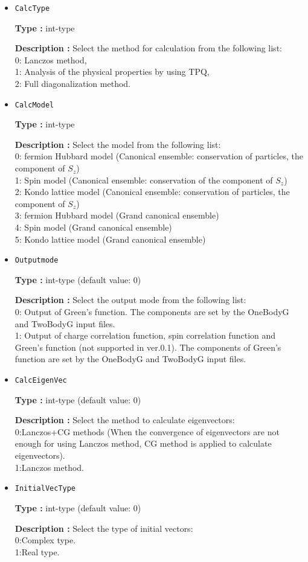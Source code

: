 \begin{itemize}
\item  \verb|CalcType|

{\bf Type :} int-type 

{\bf Description :} Select the method for calculation from the following list:\\
0: Lanczos method,\\
1: Analysis of the physical properties by using TPQ,\\
2: Full diagonalization method.\\

\item  \verb|CalcModel|

{\bf Type :} int-type 

{\bf Description :} Select the model from the following list:\\
0: fermion Hubbard model (Canonical ensemble: conservation of particles, the component of $S_z$)\\
1: Spin model (Canonical ensemble: conservation of the component of $S_z$)\\
2: Kondo lattice model (Canonical ensemble: conservation of particles, the component of $S_z$)\\
3: fermion Hubbard model (Grand canonical ensemble)\\
4: Spin model (Grand canonical ensemble)\\
5: Kondo lattice model (Grand canonical ensemble)

\item  \verb|Outputmode|

{\bf Type :} int-type (default value: 0)

{\bf Description :} Select the output mode from the following list:\\
0: Output of Green's function. The components are set by the OneBodyG and TwoBodyG input files.\\
1: Output of charge correlation function, spin correlation function and Green's function (not supported in ver.0.1). The components of Green's function are set by the OneBodyG and TwoBodyG input files.\\

\item  \verb|CalcEigenVec|

{\bf Type :} int-type (default value: 0)

{\bf Description :} Select the method to calculate eigenvectors:\\
0:Lanczos+CG methods (When the convergence of eigenvectors are not enough for using Lanczos method,  CG method is applied to calculate eigenvectors).\\
1:Lanczos method.\\

\item  \verb|InitialVecType|

{\bf Type :} int-type (default value: 0)

{\bf Description :} Select the type of initial vectors:\\
0:Complex type.\\
1:Real type.\\

\end{itemize}

